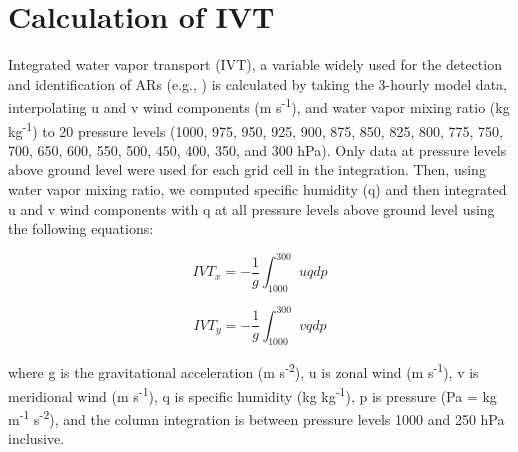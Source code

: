\documentclass[draft]{agujournal2019}
\begin{document}


%
%
%
%
\appendix
\section{Calculation of IVT}    %
\label{appendix:ivt}
Integrated water vapor transport (IVT), a variable widely used for the detection and identification of ARs (e.g., ) is calculated by taking the 3-hourly model data, interpolating u and v wind components (m s\textsuperscript{-1}), and water vapor mixing ratio (kg kg\textsuperscript{-1}) to 20 pressure levels (1000, 975, 950, 925, 900, 875, 850, 825, 800, 775, 750, 700, 650, 600, 550, 500, 450, 400, 350, and 300 hPa). Only data at pressure levels above ground level were used for each grid cell in the integration. Then, using water vapor mixing ratio, we computed specific humidity (q) and then integrated u and v wind components with q at all pressure levels above ground level using the following equations:

\begin{equation}
IVT_{x} = -\frac{1}{g} \int_{1000}^{300} u q dp
\end{equation}

\begin{equation}
IVT_{y} = -\frac{1}{g} \int_{1000}^{300} v q dp
\end{equation}

where g is the gravitational acceleration (m s\textsuperscript{-2}), u is zonal wind (m s\textsuperscript{-1}), v is meridional wind (m s\textsuperscript{-1}), q is specific humidity (kg kg\textsuperscript{-1}), p is pressure (Pa = kg m\textsuperscript{-1} s\textsuperscript{-2}), and the column integration is between pressure levels 1000 and 250 hPa inclusive.
\end{document}
